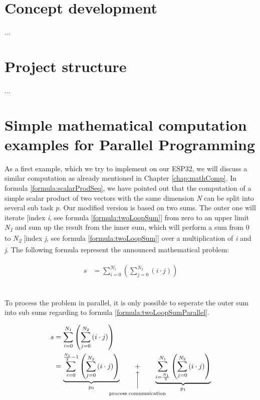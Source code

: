 \section{Concept development}

...\newpage

\section{Project structure}

...\newpage

\section{Simple mathematical computation examples for Parallel Programming} \label{chap:simpleMathCompParallel}

As a first example, which we try to implement on our ESP32, we will discuss a similar computation as already mentioned in Chapter \ref{chap:mathComp}. In formula \ref{formula:scalarProdSeq}, we have pointed out that the computation of a simple scalar product of two vectors with the same dimension \textit{N} can be split into several sub task \textit{p}. Our modified version is based on two sums. The outer one will iterate [index \textit{i}, see formula \ref{formula:twoLoopSum}] from zero to an upper limit \textit{N\textsubscript{1}} and sum up the result from the inner sum, which will perform a sum from 0 to \textit{N\textsubscript{2}} [index \textit{j}, see formula \ref{formula:twoLoopSum}] over a multiplication of \textit{i} and \textit{j}. The following formula represent the announced mathematical problem:

\begin{align} \label{formula:twoLoopSum}
	\begin{aligned}
	s &= \sum_{i = 0}^{N_1} \left( \sum_{j = 0}^{N_2} \left(i \cdot j\right) \right)
	\end{aligned}
\end{align}
\

To process the problem in parallel, it is only possible to seperate the outer sum into sub sums regarding to formula \ref{formula:twoLoopSumParallel}.

\begin{align} \label{formula:twoLoopSumParallel}
	\begin{aligned}
	s &= \sum_{i = 0}^{N_1} \left( \sum_{j = 0}^{N_2} \left(i \cdot j\right) \right)
	\\ &=  \underbrace{ 
			\sum_{i = 0}^{\frac{N_1}{2} - 1} \left( \sum_{j = 0}^{N_2} \left(i \cdot j\right) \right)
 		}_\text{p\textsubscript{0}} \qquad \vertarrowbox{+}{process communication} \qquad \underbrace{  
 			\sum_{i = \frac{N_1}{2}}^{N_1} \left( \sum_{j = 0}^{N_2} \left(i \cdot j\right) \right)
		}_\text{p\textsubscript{1}}
	\end{aligned}
\end{align}
\

